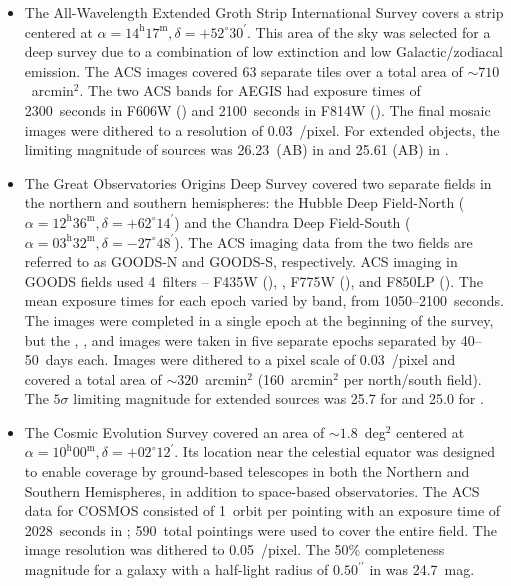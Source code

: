 \documentclass[twocolumn]{aastex6}
\begin{document}
\begin{itemize}

\item The All-Wavelength Extended Groth Strip International Survey
    \citep[AEGIS;][]{dav07} covers a strip centered at
    $\alpha=14^\textrm{h}17^\textrm{m}, \delta=+52^\circ30^\prime$. This area
    of the sky was selected for a deep survey due to a combination of low
    extinction and low Galactic/zodiacal emission. The ACS images covered 63
    separate tiles over a total area of $\sim710$~arcmin$^2$. The two ACS bands
    for AEGIS had exposure times of 2300~seconds in F606W (\Vband) and
    2100~seconds in F814W (\Iband). The final mosaic images were dithered
    to a resolution of 0.03~\arcsec/pixel. For extended objects, the
    limiting magnitude of sources was 26.23~(AB) in \Vband{} and 25.61 (AB) in
    \Iband. 

\item The Great Observatories Origins Deep Survey \citep[GOODS;][]{gia04}
    covered two separate fields in the northern and southern hemispheres: the Hubble
    Deep Field-North ($\alpha=12^\textrm{h}36^\textrm{m},
    \delta=+62^\circ14^\prime$) and the Chandra Deep Field-South
    ($\alpha=03^\textrm{h}32^\textrm{m}, \delta=-27^\circ48^\prime$). The \hst{}
    ACS imaging data from the two fields are referred to as GOODS-N and GOODS-S,
    respectively. ACS imaging in GOODS fields used 4~filters -- F435W (\Bband),
    \Vband, F775W (\iband), and F850LP (\zband). The mean exposure times for each
    epoch varied by band, from 1050--2100~seconds. The \Bband{} images were completed
    in a single epoch at the beginning of the survey, but the \Vband, \iband, and
    \zband{} images were taken in five separate epochs separated by 40--50~days
    each. Images were dithered to a pixel scale of 0.03~\arcsec/pixel and covered a
    total area of $\sim320$~arcmin$^2$ (160~arcmin$^2$ per north/south field). The
    $5\sigma$ limiting magnitude for extended sources was 25.7 for \Vband{} and
    25.0 for \iband. 

\item The Cosmic Evolution Survey \citep[COSMOS;][]{sco07} covered an area of
    $\sim1.8$~deg$^2$ centered at $\alpha=10^\textrm{h}00^\textrm{m},
    \delta=+02^\circ12^\prime$. Its location near the celestial equator was
    designed to enable coverage by ground-based telescopes in both the Northern and
    Southern Hemispheres, in addition to space-based observatories. The ACS data
    for COSMOS consisted of 1~orbit per pointing with an exposure time of
    2028~seconds in \Iband; 590~total pointings were used to cover the entire
    field. The image resolution was dithered to 0.05~\arcsec/pixel. The 50\%
    completeness magnitude for a galaxy with a half-light radius of
    $0.50^{\prime\prime}$ in \Iband{} was 24.7~mag. 


\end{itemize}
\end{document}
